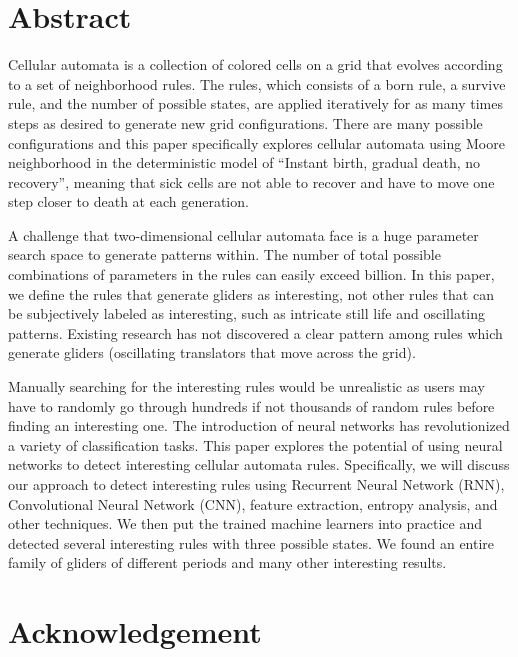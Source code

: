 \documentclass[12pt]{article}
\numberwithin{figure}{section} %
\begin{document}
\thispagestyle{plain}
\section*{\centering Abstract}
Cellular automata is a collection of colored cells on a grid that evolves according to a set of neighborhood rules. The rules, which consists of a born rule, a survive rule, and the number of possible states, are applied iteratively for as many times steps as desired to generate new grid configurations. There are many possible configurations and this paper specifically explores cellular automata using Moore neighborhood in the deterministic model of “Instant birth, gradual death, no recovery”, meaning that sick cells are not able to recover and have to move one step closer to death at each generation. 

A challenge that two-dimensional cellular automata face is a huge parameter search space to generate patterns within. The number of total possible combinations of parameters in the rules can easily exceed billion. In this paper, we define the rules that generate gliders as interesting, not other rules that can be subjectively labeled as interesting, such as intricate still life and oscillating patterns. Existing research has not discovered a clear pattern among rules which generate gliders (oscillating translators that move across the grid). 

Manually searching for the interesting rules would be unrealistic as users may have to randomly go through hundreds if not thousands of random rules before finding an interesting one. The introduction of neural networks has revolutionized a variety of classification tasks. This paper explores the potential of using neural networks to detect interesting cellular automata rules. Specifically, we will discuss our approach to detect interesting rules using Recurrent Neural Network (RNN), Convolutional Neural Network (CNN), feature extraction, entropy analysis, and other techniques. We then put the trained machine learners into practice and detected several interesting rules with three possible states. We found an entire family of gliders of different periods and many other interesting results. 

\newpage
\thispagestyle{plain}
\section*{\centering Acknowledgement}
\end{document}
